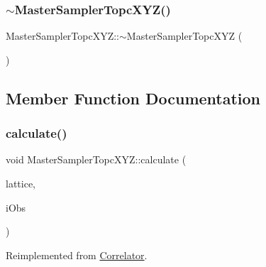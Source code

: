 \subsubsection{\texorpdfstring{$\sim$MasterSamplerTopcXYZ()}{~MasterSamplerTopcXYZ()}}
{\footnotesize\ttfamily Master\+Sampler\+Topc\+X\+Y\+Z\+::$\sim$\+Master\+Sampler\+Topc\+X\+YZ (\begin{DoxyParamCaption}{ }\end{DoxyParamCaption})}



\subsection{Member Function Documentation}
\mbox{\label{class_master_sampler_topc_x_y_z_a0ea80ad9935db791f00461b7dfd548b7}} 
\subsubsection{\texorpdfstring{calculate()}{calculate()}}
{\footnotesize\ttfamily void Master\+Sampler\+Topc\+X\+Y\+Z\+::calculate (\begin{DoxyParamCaption}\item[{\mbox{\hyperlink{class_lattice}{Lattice}}$<$ \mbox{\hyperlink{class_s_u3}{S\+U3}} $>$ $\ast$}]{lattice,  }\item[{unsigned int}]{i\+Obs }\end{DoxyParamCaption})\hspace{0.3cm}{\ttfamily [virtual]}}



Reimplemented from \mbox{\hyperlink{class_correlator_ab33502ff305f891c5c2e6d66a26a0247}{Correlator}}.

